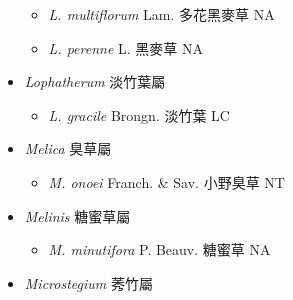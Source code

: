 \begin{itemize}
  \begin{itemize}
        \item[] \textit{L. multiflorum} Lam.  多花黑麥草   NA
        \item[] \textit{L. perenne} L.  黑麥草   NA
  \end{itemize}
 \item[] \textit{Lophatherum} 淡竹葉屬
                                
  \begin{itemize}
        \item[] \textit{L. gracile} Brongn.  淡竹葉   LC
  \end{itemize}
 \item[] \textit{Melica} 臭草屬
                                
  \begin{itemize}
        \item[] \textit{M. onoei} Franch. \& Sav.  小野臭草   NT
  \end{itemize}
 \item[] \textit{Melinis} 糖蜜草屬
                                
  \begin{itemize}
        \item[] \textit{M. minutifora} P. Beauv.  糖蜜草   NA
  \end{itemize}
 \item[] \textit{Microstegium} 莠竹屬
                                

\end{itemize}
